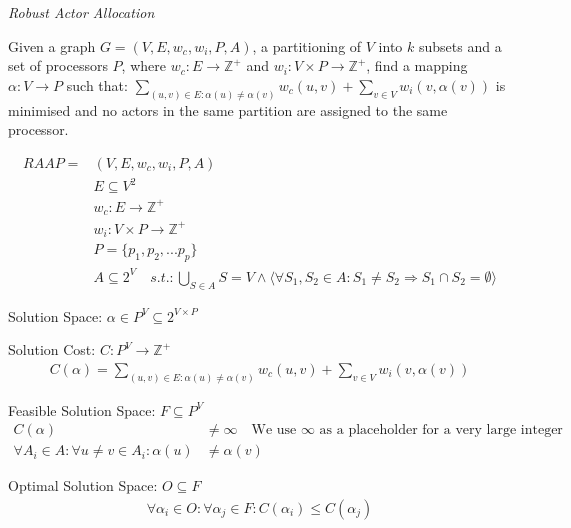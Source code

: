 \documentclass{article}
\begin{document}
\begin{definition}
{\em Robust Actor Allocation}

Given a graph $G=(V,E,w_c,w_i, P, A)$, a partitioning of $V$ into $k$ subsets and a set of processors $P$, where $w_c : E \rightarrow \mathbb{Z}^+$ and $w_i : V \times P \rightarrow \mathbb{Z}^+$, find a mapping $\alpha : V \rightarrow P$ such that:
$\displaystyle\sum\limits_{(u,v) \in E : \alpha(u) \neq \alpha(v)} w_c(u,v) + \displaystyle\sum\limits_{v \in V} w_i(v, \alpha(v))$ is minimised and no actors in the same partition are assigned to the same processor.

\begin{align}
	\nonumber RAAP = & (V,E,w_c, w_i, P, A)\\
	\nonumber & E \subseteq V^2\\
	\nonumber & w_c : E \rightarrow \mathbb{Z}^+\\
	\nonumber & w_i : V \times P \rightarrow \mathbb{Z}^+\\
	\nonumber & P = \{p_1, p_2, ...p_p\} \\
	\nonumber & A \subseteq 2^V \quad s.t. : \displaystyle\bigcup\limits_{S \in A} S = V \wedge \langle \forall S_1, S_2 \in A : S_1 \neq S_2 \Rightarrow S_1 \cap S_2 = \emptyset \rangle
\end{align}

Solution Space: $\alpha \in P^V \subseteq 2^{V \times P}$

Solution Cost: $C : P^V \rightarrow \mathbb{Z}^+$
\begin{align}
	\nonumber C(\alpha) = \displaystyle\sum\limits_{(u,v) \in E : \alpha(u) \neq \alpha(v)} w_c(u,v) + \displaystyle\sum\limits_{v \in V} w_i(v, \alpha(v))
\end{align}

Feasible Solution Space: $F \subseteq P^V$
\begin{align}
	\nonumber C(\alpha) & \neq \infty \quad \mbox{We use $\infty$ as a placeholder for a very large integer} \\
	\nonumber \forall A_i \in A : \forall u \neq v \in A_i : \alpha(u) & \neq  \alpha(v)
\end{align}

Optimal Solution Space: $O \subseteq F$
\begin{align}
	\nonumber 	\forall \alpha_i \in O : \forall \alpha_j \in F : C(\alpha_i) \leq C(\alpha_j)
\end{align}

\end{definition}
\end{document}
